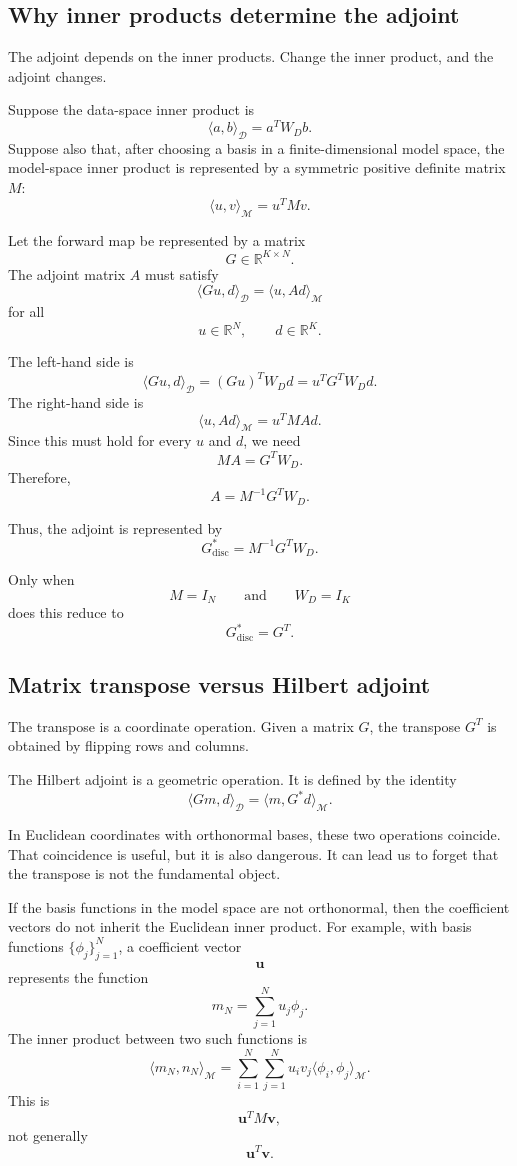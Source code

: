 \documentclass[11pt,a4paper]{book}
\newcommand{\M}{\mathcal{M}}      %
\newcommand{\D}{\mathcal{D}}      %
\newcommand{\R}{\mathbb{R}}
\newcommand{\G}{G}
\newcommand{\Gadj}{G^\ast}
\begin{document}
\subsection{Why inner products determine the adjoint}

The adjoint depends on the inner products. Change the inner product, and the
adjoint changes.

Suppose the data-space inner product is
\[
    \langle a,b\rangle_{\D}=a^T W_D b.
\]
Suppose also that, after choosing a basis in a finite-dimensional model space,
the model-space inner product is represented by a symmetric positive definite
matrix $M$:
\[
    \langle u,v\rangle_{\M}=u^T M v.
\]

Let the forward map be represented by a matrix
\[
    G\in\R^{K\times N}.
\]
The adjoint matrix $A$ must satisfy
\[
    \langle Gu,d\rangle_{\D}
    =
    \langle u,Ad\rangle_{\M}
\]
for all
\[
    u\in\R^N,
    \qquad
    d\in\R^K.
\]

The left-hand side is
\[
    \langle Gu,d\rangle_{\D}
    =
    (Gu)^T W_D d
    =
    u^T G^T W_D d.
\]
The right-hand side is
\[
    \langle u,Ad\rangle_{\M}
    =
    u^T M A d.
\]
Since this must hold for every $u$ and $d$, we need
\[
    M A = G^T W_D.
\]
Therefore,
\[
    A = M^{-1}G^T W_D.
\]

Thus, the adjoint is represented by
\[
    G^\ast_{\mathrm{disc}}
    =
    M^{-1}G^T W_D.
\]

Only when
\[
    M=I_N
    \qquad
    \text{and}
    \qquad
    W_D=I_K
\]
does this reduce to
\[
    G^\ast_{\mathrm{disc}}=G^T.
\]

\subsection{Matrix transpose versus Hilbert adjoint}

The transpose is a coordinate operation. Given a matrix $G$, the transpose
$G^T$ is obtained by flipping rows and columns.

The Hilbert adjoint is a geometric operation. It is defined by the identity
\[
    \langle \G m,d\rangle_{\D}
    =
    \langle m,\Gadj d\rangle_{\M}.
\]

In Euclidean coordinates with orthonormal bases, these two operations coincide.
That coincidence is useful, but it is also dangerous. It can lead us to forget
that the transpose is not the fundamental object.

If the basis functions in the model space are not orthonormal, then the
coefficient vectors do not inherit the Euclidean inner product. For example,
with basis functions $\{\phi_j\}_{j=1}^N$, a coefficient vector
\[
    \bm{u}
\]
represents the function
\[
    m_N=\sum_{j=1}^N u_j\phi_j.
\]
The inner product between two such functions is
\[
    \langle m_N,n_N\rangle_{\M}
    =
    \sum_{i=1}^N\sum_{j=1}^N
    u_i v_j
    \langle \phi_i,\phi_j\rangle_{\M}.
\]
This is
\[
    \bm{u}^T M\bm{v},
\]
not generally
\[
    \bm{u}^T\bm{v}.
\]
\end{document}
